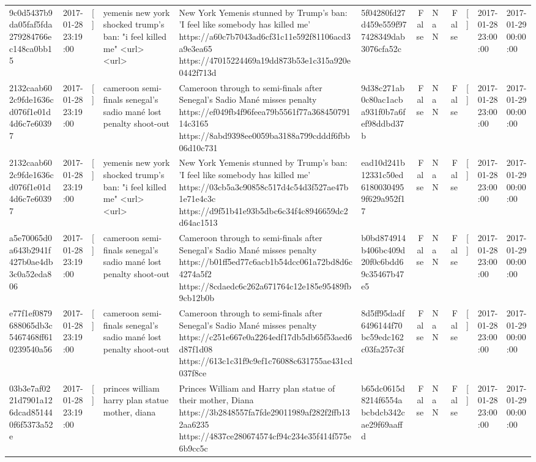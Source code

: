 \begin{tabular}{llllllrlrlll}
9c0d5437b9da05faf5fda279284766ec148ca0bb15 & 2017-01-28 23:19:00 & [] & yemenis new york shocked trump's ban: "i feel killed me" <url> <url> & New York Yemenis stunned by Trump's ban: 'I feel like somebody has killed me' https://a60c7b7043ad6cf31c11e592f81106acd3a9e3ea65 https://47015224469a19dd873b53e1c315a920e0442f713d & 5f04280fd27d459e559f977428349dab3076cfa52c & False & NaN & False & [] & 2017-01-28 23:00:00 & 2017-01-29 00:00:00 \\
2132caab602c9fde1636cd076f1e01d4d6c7e60397 & 2017-01-28 23:19:00 & [] & cameroon semi-finals senegal's sadio mané lost penalty shoot-out & Cameroon through to semi-finals after Senegal’s Sadio Mané misses penalty https://ef049fb4f96feea79b5561f77a36845079114c3165 https://8abd9398ee0059ba3188a799cdddf6fbb06d10c731 & 9d38c271ab0c80ac1acba931f0b7a6fef98ddbd37b & False & NaN & False & [] & 2017-01-28 23:00:00 & 2017-01-29 00:00:00 \\
2132caab602c9fde1636cd076f1e01d4d6c7e60397 & 2017-01-28 23:19:00 & [] & yemenis new york shocked trump's ban: "i feel killed me" <url> <url> & New York Yemenis stunned by Trump's ban: 'I feel like somebody has killed me' https://03cb5a3c90858c517d4c54d3f527ae47b1e71e4c3c https://d9f51b41e93b5dbc6c34f4c8946659dc2d64ac1513 & ead10d241b12331c50ed61800304959f629a952f17 & False & NaN & False & [] & 2017-01-28 23:00:00 & 2017-01-29 00:00:00 \\
a5e70065d0a643b2941f427b0ae4db3c0a52eda806 & 2017-01-28 23:19:00 & [] & cameroon semi-finals senegal's sadio mané lost penalty shoot-out & Cameroon through to semi-finals after Senegal’s Sadio Mané misses penalty https://b01ff5ed77c6acb1b54dcc061a72bd8d6c4274a5f2 https://8cdaedc6c262a671764c12e185e95489fb9cb12b0b & b0bd874914b406bc409d20f0c6bdd69c35467b47e5 & False & NaN & False & [] & 2017-01-28 23:00:00 & 2017-01-29 00:00:00 \\
e77f1ef0879688065db3c5467468ff610239540a56 & 2017-01-28 23:19:00 & [] & cameroon semi-finals senegal's sadio mané lost penalty shoot-out & Cameroon through to semi-finals after Senegal’s Sadio Mané misses penalty https://c251e667e0a2264edf17db5db65f53aed6d87f1d08 https://613c1c31f9c9ef1c76088c631755ae431cd037f8ce & 8d5ff95dadf6496144f70bc59edc162c03fa257c3f & False & NaN & False & [] & 2017-01-28 23:00:00 & 2017-01-29 00:00:00 \\
03b3e7af0221d7901a126dcad851440f6f5373a52e & 2017-01-28 23:19:00 & [] & princes william harry plan statue mother, diana & Princes William and Harry plan statue of their mother, Diana https://3b2848557fa7fde29011989af282f2ffb132aa6235 https://4837ce280674574cf94c234e35f414f575e6b9cc5c & b65dc0615d8214f6554abcbdcb342cae29f69aaffd & False & NaN & False & [] & 2017-01-28 23:00:00 & 2017-01-29 00:00:00 \\

\end{tabular}
